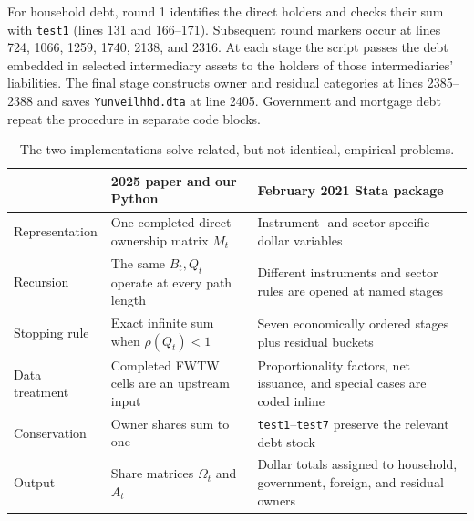 \documentclass[11pt]{article}
\newcommand{\matM}{\bar M}
\newcommand{\code}[1]{\texttt{#1}}
\begin{document}
For household debt, round 1 identifies the direct holders and checks their sum
with \code{test1} (lines 131 and 166--171). Subsequent round markers occur at
lines 724, 1066, 1259, 1740, 2138, and 2316. At each stage the script passes
the debt embedded in selected intermediary assets to the holders of those
intermediaries' liabilities. The final stage constructs owner and residual
categories at lines 2385--2388 and saves \code{Yunveilhhd.dta} at line 2405.
Government and mortgage debt repeat the procedure in separate code blocks.

\begin{table}[htbp]
  \centering
  \caption{The two implementations solve related, but not identical, empirical
    problems.}
  \label{tab:implementation-comparison}
  \small
  \begin{tabular}{@{}p{}p{}p{}@{}}
    \toprule
     & \textbf{2025 paper and our Python}                                            & \textbf{February 2021 Stata package} \\
    \midrule
    Representation
     & One completed direct-ownership matrix $\matM_t$
     & Instrument- and sector-specific dollar variables                                                                     \\
    Recursion
     & The same $B_t,Q_t$ operate at every path length
     & Different instruments and sector rules are opened at named stages                                                    \\
    Stopping rule
     & Exact infinite sum when $\rho(Q_t)<1$
     & Seven economically ordered stages plus residual buckets                                                              \\
    Data treatment
     & Completed FWTW cells are an upstream input
     & Proportionality factors, net issuance, and special cases are coded inline                                            \\
    Conservation
     & Owner shares sum to one
     & \code{test1}--\code{test7} preserve the relevant debt stock                                                          \\
    Output
     & Share matrices $\Omega_t$ and $A_t$
     & Dollar totals assigned to household, government, foreign, and residual owners                                        \\
    \bottomrule
  \end{tabular}
\end{table}
\end{document}
